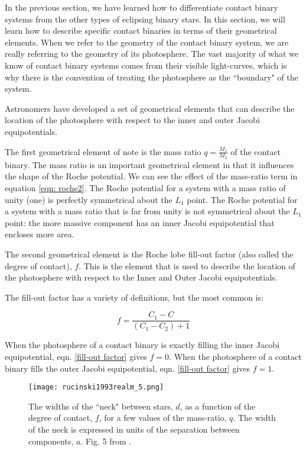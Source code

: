 \documentclass[12pt]{article} %
\numberwithin{equation}{section} %
\begin{document}
In the previous section, we have learned how to differentiate contact binary systems from the other types of eclipsing binary stars. In this section, we will learn how to describe specific contact binaries in terms of their geometrical elements. When we refer to the geometry of the contact binary system, we are really referring to the geometry of its photosphere. The vast majority of what we know of contact binary systems comes from their visible light-curves, which is why there is the convention of treating the photosphere as the ``boundary" of the system.

Astronomers have developed a set of geometrical elements that can describe the location of the photosphere with respect to the inner and outer Jacobi equipotentials. 

The first geometrical element of note is the mass ratio $q = \frac{M_{1}}{M_{2}}$ of the contact binary. The mass ratio is an important geometrical element in that it influences the shape of the Roche potential. We can see the effect of the mass-ratio term in equation \ref{eqn: roche2}. The Roche potential for a system with a mass ratio of unity (one) is perfectly symmetrical about the $L_{1}$ point. The Roche potential for a system with a mass ratio that is far from unity is not symmetrical about the $L_{1}$ point: the more massive component has an inner Jacobi equipotential that encloses more area.

The second geometrical element is the Roche lobe fill-out factor (also called the degree of contact), $f$. This is the element that is used to describe the location of the photosphere with respect to the Inner and Outer Jacobi equipotentials.

The fill-out factor has a variety of definitions, but the most common is:

\begin{equation} \label{fill-out factor}
f = \frac{C_{1} - C}{(C_{1} - C_{2}) + 1}
\end{equation}

When the photosphere of a contact binary is exactly filling the inner Jacobi equipotential, eqn. \ref{fill-out factor} gives $f = 0$. When the photosphere of a contact binary fills the outer Jacobi equipotential, eqn. \ref{fill-out factor} gives $f = 1$.

\begin{figure}[H]
\centering
\texttt{[image: rucinski1993realm\_5.png]}
\caption{The widths of the ``neck" between stars, $d$, as a function of the degree of contact, $f$, for a few values of the mass-ratio, $q$. The width of the neck is expressed in units of the separation between components, $a$. Fig. 5 from \citet{rucinski1993realm}.}
\label{fig: rucinski1993realm_5}
\end{figure}
\end{document}
